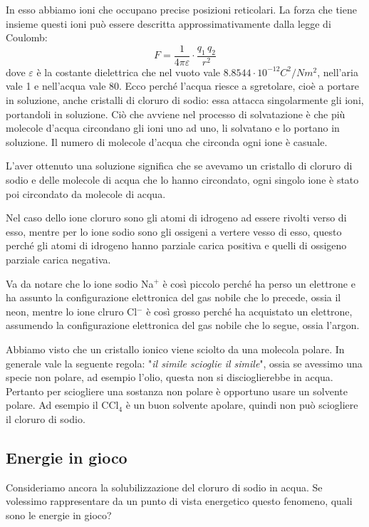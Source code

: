 In esso abbiamo ioni che occupano precise posizioni reticolari. La forza che tiene insieme questi ioni può essere descritta approssimativamente dalla legge di Coulomb:
$$\displaystyle F= \frac{1}{4 \pi \varepsilon} \cdot \frac{q_1 \, q_2}{r^2}$$
dove $\varepsilon$ è la costante dielettrica che nel vuoto vale $8.8544 \cdot 10^{-12} C^2/Nm^2$, nell'aria vale 1 e nell'acqua vale 80. Ecco perché l'acqua riesce a sgretolare, cioè a portare in soluzione, anche cristalli di cloruro di sodio: essa attacca singolarmente gli ioni, portandoli in soluzione. Ciò che avviene nel processo di solvatazione è che più molecole d'acqua circondano gli ioni uno ad uno, li solvatano e lo portano in soluzione. Il numero di molecole d'acqua che circonda ogni ione è casuale.

L'aver ottenuto una soluzione significa che se avevamo un cristallo di cloruro di sodio e delle molecole di acqua che lo hanno circondato, ogni singolo ione è stato poi circondato da molecole di acqua.

Nel caso dello ione cloruro sono gli atomi di idrogeno ad essere rivolti verso di esso, mentre per lo ione sodio sono gli ossigeni a vertere vesso di esso, questo perché gli atomi di idrogeno hanno parziale carica positiva e quelli di ossigeno parziale carica negativa.

Va da notare che lo ione sodio Na$^+$ è così piccolo perché ha perso un elettrone e ha assunto la configurazione elettronica del gas nobile che lo precede, ossia il neon, mentre lo ione clruro Cl$^-$ è così grosso perché ha acquistato un elettrone, assumendo la configurazione elettronica del gas nobile che lo segue, ossia l'argon.

\vspace{0.2cm}Abbiamo visto che un cristallo ionico viene sciolto da una molecola polare. In generale vale la seguente regola: "\textit{il simile scioglie il simile}", ossia se avessimo una specie non polare, ad esempio l'olio, questa non si discioglierebbe in acqua. Pertanto per sciogliere una sostanza non polare è opportuno usare un solvente polare. Ad esempio il CCl$_4$ è un buon solvente apolare, quindi non può sciogliere il cloruro di sodio.

\subsection{Energie in gioco}

Consideriamo ancora la solubilizzazione del cloruro di sodio in acqua. Se volessimo rappresentare da un punto di vista energetico questo fenomeno, quali sono le energie in gioco?

